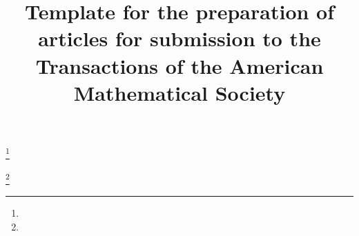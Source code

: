 \documentclass{tran-l}
\theoremstyle{definition}
\theoremstyle{remark}
\numberwithin{equation}{section}
\begin{document}
\title{Template for the preparation of articles for submission to the Transactions of the American Mathematical Society}


\author{}
\address{}
\curraddr{}
\email{}
\thanks{}

\author{}
\address{}
\curraddr{}
\email{}
\thanks{}


\date{}

\dedicatory{}

\begin{abstract}
\end{abstract}

\maketitle



\end{document}
